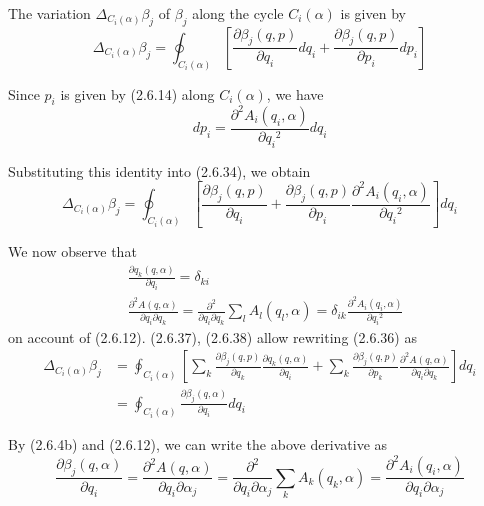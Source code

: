\documentclass{article}
\begin{document}
The variation $\Delta_{C_{i}(\alpha)} \beta_{j}$ of $\beta_{j}$ along the cycle $C_{i}(\alpha)$ is given by
$$
\begin{equation*}
\Delta_{C_{i}(\alpha)} \beta_{j}=\oint_{C_{i}(\alpha)}\left[\frac{\partial \beta_{j}(q, p)}{\partial q_{i}} d q_{i}+\frac{\partial \beta_{j}(q, p)}{\partial p_{i}} d p_{i}\right] \tag{2.6.34}
\end{equation*}
$$

Since $p_{i}$ is given by (2.6.14) along $C_{i}(\alpha)$, we have
$$
\begin{equation*}
d p_{i}=\frac{\partial^{2} A_{i}\left(q_{i}, \alpha\right)}{\partial q_{i}{ }^{2}} d q_{i} \tag{2.6.35}
\end{equation*}
$$

Substituting this identity into (2.6.34), we obtain
$$
\begin{equation*}
\Delta_{C_{i}(\alpha)} \beta_{j}=\oint_{C_{i}(\alpha)}\left[\frac{\partial \beta_{j}(q, p)}{\partial q_{i}}+\frac{\partial \beta_{j}(q, p)}{\partial p_{i}} \frac{\partial^{2} A_{i}\left(q_{i}, \alpha\right)}{\partial q_{i}{ }^{2}}\right] d q_{i} \tag{2.6.36}
\end{equation*}
$$

We now observe that
$$
\begin{align*}
& \frac{\partial q_{k}(q, \alpha)}{\partial q_{i}}=\delta_{k i}  \tag{2.6.37}\\
& \frac{\partial^{2} A(q, \alpha)}{\partial q_{i} \partial q_{k}}=\frac{\partial^{2}}{\partial q_{i} \partial q_{k}} \sum_{l} A_{l}\left(q_{l}, \alpha\right)=\delta_{i k} \frac{\partial^{2} A_{i}\left(q_{i}, \alpha\right)}{\partial q_{i}{ }^{2}} \tag{2.6.38}
\end{align*}
$$
on account of (2.6.12). (2.6.37), (2.6.38) allow rewriting (2.6.36) as
$$
\begin{align*}
\Delta_{C_{i}(\alpha)} \beta_{j} & =\oint_{C_{i}(\alpha)}\left[\sum_{k} \frac{\partial \beta_{j}(q, p)}{\partial q_{k}} \frac{\partial q_{k}(q, \alpha)}{\partial q_{i}}+\sum_{k} \frac{\partial \beta_{j}(q, p)}{\partial p_{k}} \frac{\partial^{2} A(q, \alpha)}{\partial q_{i} \partial q_{k}}\right] d q_{i}  \tag{2.6.39}\\
& =\oint_{C_{i}(\alpha)} \frac{\partial \beta_{j}(q, \alpha)}{\partial q_{i}} d q_{i}
\end{align*}
$$

By (2.6.4b) and (2.6.12), we can write the above derivative as
$$
\begin{equation*}
\frac{\partial \beta_{j}(q, \alpha)}{\partial q_{i}}=\frac{\partial^{2} A(q, \alpha)}{\partial q_{i} \partial \alpha_{j}}=\frac{\partial^{2}}{\partial q_{i} \partial \alpha_{j}} \sum_{k} A_{k}\left(q_{k}, \alpha\right)=\frac{\partial^{2} A_{i}\left(q_{i}, \alpha\right)}{\partial q_{i} \partial \alpha_{j}} \tag{2.6.40}
\end{equation*}
$$
\end{document}
